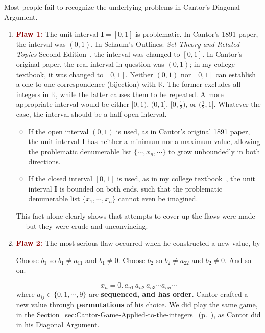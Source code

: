 \documentclass[12pt]{article}
\theoremstyle{definition} %
\numberwithin{equation}{section}
\newcommand{\boldred}[2]			   
{\textbf{\textcolor{darkred}{#1 #2}}}
\newcommand{\customref}[2]{\ref{#1:#2} \,\nameref{#1:#2}(p.~\pageref{#1:#2})}
\begin{document}
Most people fail to recognize the underlying problems in Cantor’s Diagonal Argument. 

\begin{enumerate}
\item \boldred{Flaw}{1:} The unit interval \(\bm{I} = \left[0, 1\right]\) is problematic. In Cantor's 1891 paper, the interval was \(\left(0, 1\right)\). In Schaum's Outlines: \textit{Set Theory and Related Topics} Second Edition~\cite{lipschutz1998}, the interval was changed to \(\left[0, 1\right]\). In Cantor's original paper, the real interval in question was \( (0,1) \); in my college textbook, it was changed to \( [0,1] \). Neither \( (0,1) \) nor \( [0,1] \) can establish a one-to-one correspondence (bijection) with \( \mathbb{R} \). The former excludes all integers in \( \mathbb{R} \), while the latter causes them to be repeated. A more appropriate interval would be either \( [0,1) \), \( (0,1] \), \( [0, \frac{1}{2}) \), or \( (\frac{1}{2},1] \). Whatever the case, the interval should be a half-open interval.

\begin{itemize}
\item If the open interval \(\left(0, 1\right)\) is used, as in Cantor's original 1891 paper, the unit interval \(\bm{I}\) has neither a minimum nor a maximum value, allowing the problematic denumerable list \(\{\cdots, x_n, \cdots \}\) to grow unboundedly in both directions.

\item If the closed interval \(\left[0, 1\right]\) is used, as in my college textbook~\cite{lipschutz1998}, the unit interval \(\bm{I}\) is bounded on both ends, such that the problematic denumerable list \(\{x_1, \cdots, x_n \}\) cannot even be imagined.

\end{itemize}

This fact alone clearly shows that attempts to cover up the flaws were made — but they were crude and unconvincing.

\item \boldred{Flaw}{2:} The most serious flaw occurred when he constructed a new value, by 
\begin{center}
Choose \(b_1\) so \(b_1 \neq a_{11}\) and \(b_1 \neq 0\). Choose \(b_2\) so \(b_2 \neq a_{22}\) and \(b_2 \neq 0\). And so on.
\end{center}
\[
x_n = 0.\,a_{n1}\,a_{n2}\,a_{n3} \cdots a_{nn}\cdots 
\]
where \(a_{ij} \in \{0, 1, \cdots, 9\}\) are \textbf{sequenced, and has order}. Cantor crafted a new value through \textbf{permutations} of his choice. We did play the same game, in the Section~\customref{sec}{Cantor-Game-Applied-to-the-integers}, as Cantor did in his Diagonal Argument.
\end{enumerate}
\end{document}
